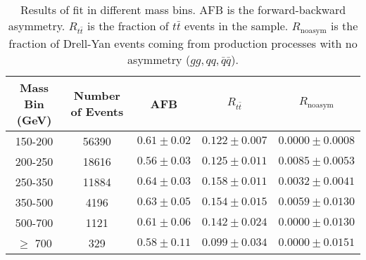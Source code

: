 \documentclass[
10pt, %
a4paper, %
oneside, %
headinclude,footinclude, %
BCOR5mm, %
]{scrartcl}
\begin{document}
\begin{table}[htp]
    \centering
    \label{tab:results}

 \caption{ Results of fit in different mass bins. AFB is the forward-backward asymmetry.
 $R_{t\bar{t}}$ is the fraction of $t\bar{t}$ events in the sample.
 $R_{\text{noasym}}$ is the fraction of Drell-Yan events coming from production processes with no asymmetry 
 ($gg, qq, \bar{q}\bar{q}$).}
\begin{tabular}{|| c | c | c | c | c ||}
    \hline
    Mass Bin (GeV)  & Number of Events &  
    AFB & $R_{t \bar{t}}$ & $R_{\text{noasym}}$  \\
 \hline \hline
 150-200 & 56390 & $0.61 \pm 0.02$ & $0.122 \pm 0.007$ & $0.0000 \pm 0.0008$  \\
 200-250 & 18616 & $0.56 \pm 0.03$ & $0.125 \pm 0.011$ & $0.0085 \pm 0.0053$ \\
 250-350 & 11884 & $0.64 \pm 0.03$ & $0.158 \pm 0.011$ & $0.0032 \pm 0.0041$ \\
 350-500 & 4196 & $0.63 \pm 0.05$ & $0.154 \pm 0.015$  & $0.0059 \pm 0.0130$ \\
 500-700 & 1121 & $0.61 \pm 0.06$ & $0.142 \pm 0.024$  & $0.0000 \pm 0.0130$ \\
 $\geq$ 700 & 329 & $0.58 \pm 0.11$ & $0.099 \pm 0.034$ & $0.0000 \pm 0.0151$ \\



 \hline

 \end{tabular}

\end{table}

    


\end{document}
